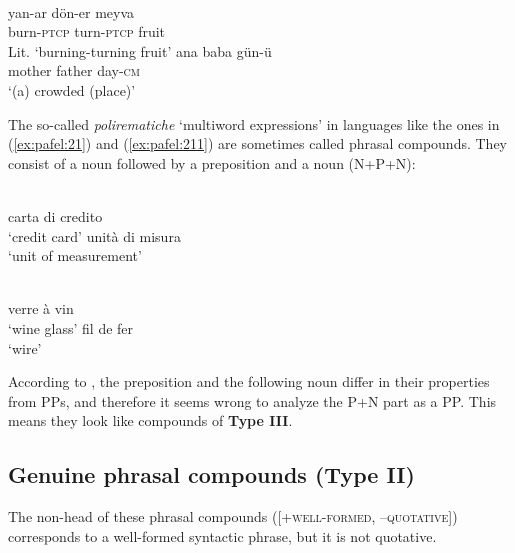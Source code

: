 \documentclass[output=paper]{LSP/langsci}
\begin{document}
\ea
      \\
      \ea\label{ex:pafel:20a}      
      \gll  yan-ar dön-er meyva\\
            burn-\textsc{ptcp} turn-\textsc{ptcp} fruit\\
      \glt  Lit. `burning-turning fruit'
      \ex\label{ex:pafel:20b}
      \gll   ana baba gün-ü   \\
             mother father day-\textsc{cm}   \\
      \glt  `(a) crowded (place)'
    \z
\z          

The so-called \textit{polirematiche} `multiword expressions' in  languages like the ones in (\ref{ex:pafel:21}) and (\ref{ex:pafel:211}) are sometimes called phrasal compounds. They consist of a noun followed by a preposition and a noun (N+P+N):

\ea\label{ex:pafel:21}
      \\
      \ea\label{ex:pafel:21a}      
        carta di credito    \\
      \glt  `credit card'
      \ex\label{ex:pafel:21b}
         unità di misura   \\
      \glt  `unit of measurement'
    \z
\z

\ea\label{ex:pafel:211}
      \\
      \ea\label{ex:pafel:211a}      
        verre à vin    \\
      \glt  `wine glass'
      \ex\label{ex:pafel:211b}
         fil de fer   \\
      \glt  `wire'
    \z
\z

According to \citet[397f.]{Bisetto2015}, the preposition and the following noun differ in their properties from PPs, and therefore it seems wrong to analyze the P+N part as a PP. This means they look like compounds of \textbf{Type III}.


\subsection{Genuine phrasal compounds (\textbf{Type II})}

The non-head of these phrasal compounds ([+\textsc{well-formed}, –\textsc{quotative}]) corresponds to a well-formed syntactic phrase, but it is not quotative.
\end{document}
